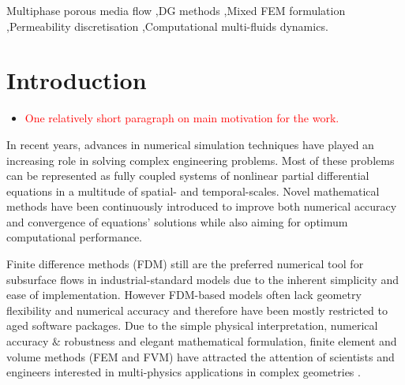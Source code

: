 \documentclass[preprint,authoryear,12pt]{elsarticle}
\begin{document}
\begin{frontmatter}
\begin{keyword}
Multiphase porous media flow \sep DG methods \sep Mixed FEM formulation \sep Permeability discretisation \sep Computational multi-fluids dynamics. 
\end{keyword}

\end{frontmatter}

\section{Introduction}

\begin{itemize}
\item \textcolor{red}{One relatively short paragraph on main motivation for the work.}
\end{itemize}

In recent years, advances in numerical simulation techniques have played an increasing role in solving complex engineering problems. Most of these problems can be represented as fully coupled systems of nonlinear partial differential equations in a multitude of spatial- and temporal-scales. Novel mathematical methods have been continuously introduced to improve both numerical accuracy and convergence of equations' solutions while also aiming for optimum computational performance. 

Finite difference methods (FDM) still are the preferred numerical tool for subsurface flows in industrial-standard models due to the inherent simplicity and ease of implementation. However FDM-based models often lack geometry flexibility and numerical accuracy and therefore have been mostly restricted to aged software packages.  Due to the simple physical interpretation, numerical accuracy $\&$ robustness and elegant mathematical formulation, finite element and volume methods (FEM and FVM) have attracted the attention of scientists and engineers interested in multi-physics applications in complex geometries \citep{cordazzo_2006, geiger_2004,nick_2011}. 
\end{document}
